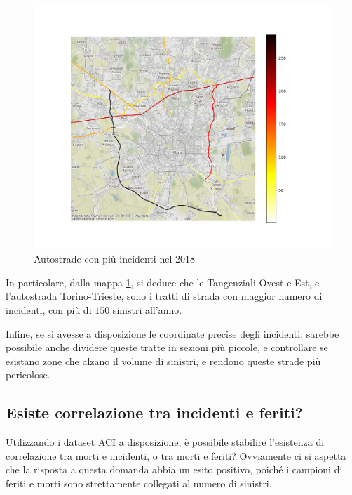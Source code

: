 \documentclass[a4paper,12pt]{report}
\begin{document}
\begin{figure}
    \includegraphics[width=\linewidth]{../src/incidenti/incidenti_aci/autostrade/incidenti_line_chart.png}
    \caption{Autostrade con più incidenti nel 2018}
    \label{fig:line-incidenti-milano}
\end{figure}

In particolare, dalla mappa \ref{fig:line-incidenti-milano}, si deduce che le 
Tangenziali Ovest e Est, e l'autostrada Torino-Trieste, sono i tratti di 
strada con maggior numero di incidenti, con più di $150$ sinistri all'anno.

Infine, se si avesse a disposizione le coordinate precise degli incidenti, 
sarebbe possibile anche dividere queste tratte in sezioni più piccole, 
e controllare se esistano zone che alzano il volume di sinistri, e rendono queste strade 
più pericolose.

\subsection{Esiste correlazione tra incidenti e feriti?}

Utilizzando i dataset ACI a disposizione, è possibile stabilire l'esistenza di 
correlazione tra morti e incidenti, o tra morti e feriti?
Ovviamente ci si aspetta che la risposta a questa domanda abbia un 
esito positivo, poiché 
i campioni di feriti e morti sono strettamente collegati al numero di sinistri.
\end{document}
